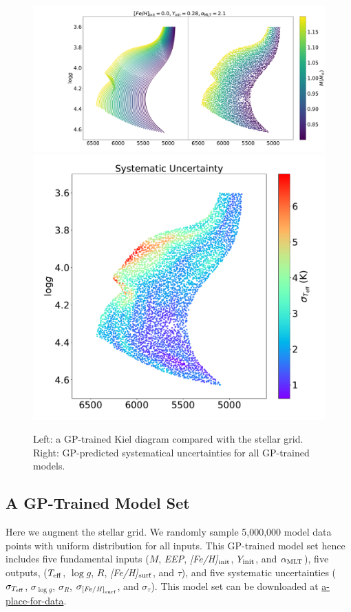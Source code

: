 \begin{figure}
	\includegraphics[width=1.3\columnwidth]{5d-au-mass.pdf}
	\includegraphics[width=0.7\columnwidth]{5d-au-mass-sys.pdf}
    \caption{ Left: a GP-trained Kiel diagram compared with the stellar grid. Right: GP-predicted systematical uncertainties for all GP-trained models.} 
  \label{fig:5d_augmentation}
\end{figure}

\subsection{A GP-Trained Model Set}

Here we augment the stellar grid. 
We randomly sample 5,000,000 model data points with uniform distribution for all inputs. This GP-trained model set hence includes five fundamental inputs ($M$, {\it EEP}, {\it [Fe/H]}$_{\rm init}$, $Y_{\rm init}$, and $\alpha_{\rm MLT}$), five outputs, ($T_{\rm eff}$, $\log g$,  $R$,  {\it [Fe/H]}$_{\rm surf}$, and  $\tau$), and five systematic uncertainties ($\sigma_{T_{\rm eff}}$, $\sigma_{\log g}$,  $\sigma_{R}$,  $\sigma_{\rm {\it [Fe/H]}_{\rm surf}}$, and $\sigma_{\tau}$). This model set can be downloaded at \url{a-place-for-data}. 


